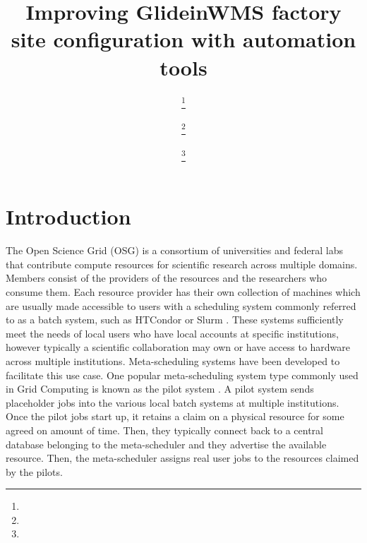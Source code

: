\documentclass{webofc}
\begin{document}
%
\title{Improving GlideinWMS factory site configuration with automation tools}
%
%

\author{ \fnsep\thanks{} \and
         \fnsep\thanks{} \and
         \fnsep\thanks{}
}


%
\maketitle
%
\section{Introduction}
\label{intro}
The Open Science Grid (OSG) \cite{OSG} is a consortium of universities and federal labs that contribute compute resources for scientific research across multiple domains. Members consist of the providers of the resources and the researchers who consume them. Each resource provider has their own collection of machines which are usually made accessible to users with a scheduling system commonly referred to as a batch system, such as HTCondor \cite{HTCondorURL} or Slurm \cite{SlurmURL}. %
These systems sufficiently meet the needs of local users who have local accounts at specific institutions, however typically a scientific collaboration may own or have access to hardware across multiple institutions. Meta-scheduling systems have been developed to facilitate this use case. One popular meta-scheduling system type commonly used in Grid Computing is known as the pilot system \cite{GlideinWMS}. A pilot system sends placeholder jobs into the various local batch systems at multiple institutions. Once the pilot jobs start up, it retains a claim on a physical resource for some agreed on amount of time.
Then, they typically connect back to a central database belonging to the meta-scheduler and they advertise the available resource. Then, the meta-scheduler assigns real user jobs to the resources claimed by the pilots. 
\end{document}
